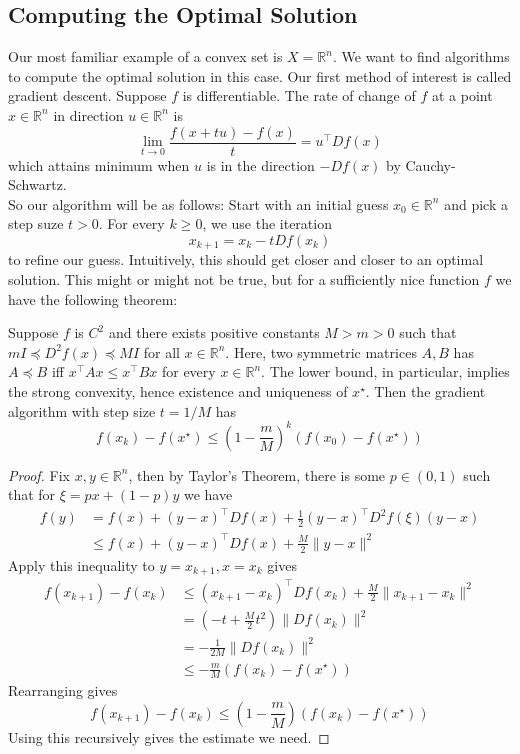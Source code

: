 \subsection{Computing the Optimal Solution}
Our most familiar example of a convex set is $X=\mathbb R^n$.
We want to find algorithms to compute the optimal solution in this case.
Our first method of interest is called gradient descent.
Suppose $f$ is differentiable.
The rate of change of $f$ at a point $x\in\mathbb R^n$ in direction $u\in\mathbb R^n$ is
$$\lim_{t\to 0}\frac{f(x+tu)-f(x)}{t}=u^\top Df(x)$$
which attains minimum when $u$ is in the direction $-Df(x)$ by Cauchy-Schwartz.\\
So our algorithm will be as follows:
Start with an initial guess $x_0\in\mathbb R^n$ and pick a step suze $t>0$.
For every $k\ge 0$, we use the iteration
$$x_{k+1}=x_k-tDf(x_k)$$
to refine our guess.
Intuitively, this should get closer and closer to an optimal solution.
This might or might not be true, but for a sufficiently nice function $f$ we have the following theorem:
\begin{theorem}
    Suppose $f$ is $C^2$ and there exists positive constants $M>m>0$ such that $mI\preceq D^2f(x)\preceq MI$ for all $x\in\mathbb R^n$.
    Here, two symmetric matrices $A,B$ has $A\preceq B$ iff $x^\top Ax\le x^\top Bx$ for every $x\in\mathbb R^n$.
    The lower bound, in particular, implies the strong convexity, hence existence and uniqueness of $x^\star$.
    Then the gradient algorithm with step size $t=1/M$ has
    $$f(x_k)-f(x^\star)\le\left( 1-\frac{m}{M} \right)^k(f(x_0)-f(x^\star))$$
\end{theorem}
\begin{proof}
    Fix $x,y\in\mathbb R^n$, then by Taylor's Theorem, there is some $p\in (0,1)$ such that for $\xi=px+(1-p)y$ we have
    \begin{align*}
        f(y)&=f(x)+(y-x)^\top Df(x)+\frac{1}{2}(y-x)^\top D^2f(\xi)(y-x)\\
        &\le f(x)+(y-x)^\top Df(x)+\frac{M}{2}\|y-x\|^2
    \end{align*}
    Apply this inequality to $y=x_{k+1},x=x_k$ gives
    \begin{align*}
        f(x_{k+1})-f(x_k)&\le (x_{k+1}-x_k)^\top Df(x_k)+\frac{M}{2}\|x_{k+1}-x_k\|^2\\
        &=\left( -t+\frac{M}{2}t^2 \right)\|Df(x_k)\|^2\\
        &=-\frac{1}{2M}\|Df(x_k)\|^2\\
        &\le-\frac{m}{M}(f(x_k)-f(x^\star))
    \end{align*}
    Rearranging gives
    $$f(x_{k+1})-f(x_k)\le\left( 1-\frac{m}{M} \right)(f(x_k)-f(x^\star))$$
    Using this recursively gives the estimate we need.
\end{proof}
